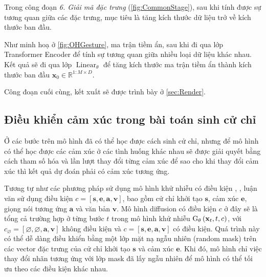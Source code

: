Trong công đoạn \textit{6. Giải mã đặc trưng} (\autoref{fig:CommonStage}), sau khi tính được sự tương quan giữa các đặc trưng, mục tiêu là tăng kích thước dữ liệu trở về kích thước ban đầu.

Như minh hoạ ở \autoref{fig:OHGesture}, ma trận tiềm ẩn, sau khi đi qua lớp Transformer Encoder để tính sự tương quan giữa nhiều loại dữ liệu khác nhau. Kết quả sẽ đi qua lớp $\operatorname{Linear}_{\theta}$ để tăng kích thước ma trận tiềm ẩn thành kích thước ban  đầu $\hat{\mathbf{x}}_{0} \in \mathbb{R}^{1:M \times D}$.

Công đoạn cuối cùng, kết xuất sẽ được trình bày ở \autoref{sec:Render}.

\subsection{Điều khiển cảm xúc trong bài toán sinh cử chỉ}

Ở các bước trên mô hình đã có thể học được cách sinh cử chỉ, nhưng để mô hình có thể học được các cảm xúc ở các tình huống khác nhau sẽ được giải quyết bằng cách tham số hóa và lần lượt thay đổi từng cảm xúc để sao cho khi thay đổi cảm xúc thì kết quả dự đoán phải có cảm xúc tương ứng.

Tương tự như các phương pháp sử dụng mô hình khử nhiễu có điều kiện \cite{ho2022classifier}, \cite{tevet2022human}, luận văn sử dụng điều kiện $c = [ \mathbf{s}, \mathbf{e}, \mathbf{a}, \mathbf{v} ]$,  bao gồm cử chỉ khởi tạo $\mathbf{s}$, cảm xúc $\mathbf{e}$, giọng nói tương ứng $\mathbf{a}$ và văn bản $\mathbf{v}$. Mô hình diffusion có điều kiện $c$ ở đây sẽ là tổng cả trường hợp ở từng bước $t$ trong mô hình khử nhiễu $\text{G}_\theta \left( \mathbf{x}_{t}, t, c \right)$, với  $c_{\varnothing}=[\varnothing, \varnothing, \mathbf{a}, \mathbf{v}]$ không điều kiện và $c = [\mathbf{s}, \mathbf{e}, \mathbf{a}, \mathbf{v}]$ có điều kiện. Quá trình này có thể dễ dàng điều khiển bằng một lớp mặt nạ ngẫu nhiên (random mask) trên các vector đặc trưng của cử chỉ khởi tạo $\mathbf{s}$ và cảm xúc $\mathbf{e}$. Khi đó, mô hình chỉ việc thay đổi nhãn tương ứng với lớp mask đã lấy ngẫu nhiên để mô hình có thể tối ưu theo các điều kiện khác nhau. 


